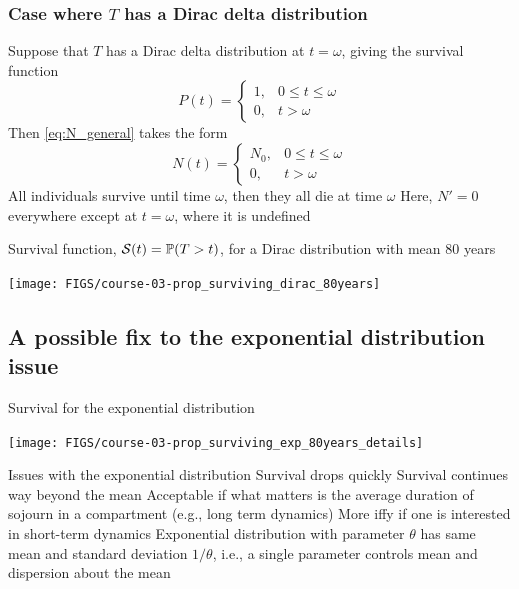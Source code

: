 \documentclass[aspectratio=169]{beamer}\usepackage[]{graphicx}\usepackage[]{xcolor}
\begin{document}
\begin{frame}\frametitle{Case where $T$ has a Dirac delta distribution}
Suppose that $T$ has a Dirac delta distribution at $t=\omega$, giving the
survival function 
\[
P(t)=\begin{cases}
1, & 0\leq t\leq\omega \\
0, & t>\omega 
\end{cases}
\]
Then \eqref{eq:N_general} takes the form
\begin{equation}\label{eq:N2}
N(t)=\begin{cases}
N_0, & 0\leq t\leq\omega \\
0, & t>\omega
\end{cases}
\end{equation}
All individuals survive until time $\omega$, then they all die at time $\omega$
\vfill
Here, $N'=0$ everywhere except at $t=\omega$, where it is undefined
\end{frame}




\begin{frame}
Survival function, $\mathcal{S}(t)=\mathbb{P}(T>t)$, for a Dirac distribution with mean 80 years
\begin{center}
\texttt{[image: FIGS/course-03-prop\_surviving\_dirac\_80years]}
\end{center}
\end{frame}




\subsection{A possible fix to the exponential distribution issue} 



\begin{frame}{Survival for the exponential distribution}
\begin{center}
\texttt{[image: FIGS/course-03-prop\_surviving\_exp\_80years\_details]}
\end{center}
\end{frame}

\begin{frame}{Issues with the exponential distribution}
\bbullet Survival drops quickly
\vfill
\bbullet Survival continues way beyond the mean
\vfill
Acceptable if what matters is the average duration of sojourn in a compartment (e.g., long term dynamics)
\vfill
More iffy if one is interested in short-term dynamics
\vfill
\bbullet Exponential distribution with parameter $\theta$ has same mean and standard deviation $1/\theta$, i.e., a single parameter controls mean and dispersion about the mean
\end{frame}
\end{document}
